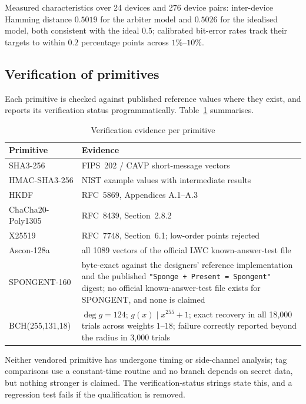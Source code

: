 \documentclass[11pt,a4paper]{article}
\begin{document}
Measured characteristics over 24 devices and 276 device pairs: inter-device Hamming
distance $0.5019$ for the arbiter model and $0.5026$ for the idealised model, both
consistent with the ideal $0.5$; calibrated bit-error rates track their targets to
within $0.2$ percentage points across $1\%$--$10\%$.

\subsection{Verification of primitives}

Each primitive is checked against published reference values where they exist, and
reports its verification status programmatically. Table~\ref{tab:kat} summarises.

\begin{table}[H]
\centering
\caption{Verification evidence per primitive}
\label{tab:kat}
\small
\begin{tabular}{@{}p{3.4cm}p{8.4cm}@{}}
\toprule
\textbf{Primitive} & \textbf{Evidence} \\
\midrule
SHA3-256 & FIPS~202 / CAVP short-message vectors \\
HMAC-SHA3-256 & NIST example values with intermediate results \\
HKDF & RFC~5869, Appendices A.1--A.3 \\
ChaCha20-Poly1305 & RFC~8439, Section~2.8.2 \\
X25519 & RFC~7748, Section~6.1; low-order points rejected \\
Ascon-128a & all 1089 vectors of the official LWC known-answer-test file \\
SPONGENT-160 & byte-exact against the designers' reference implementation and the
published \texttt{"Sponge + Present = Spongent"} digest; no official
known-answer-test file exists for SPONGENT, and none is claimed \\
BCH(255,131,18) & $\deg g = 124$; $g(x) \mid x^{255}+1$; exact recovery in all
18{,}000 trials across weights $1$--$18$; failure correctly reported beyond the
radius in 3{,}000 trials \\
\bottomrule
\end{tabular}
\end{table}

Neither vendored primitive has undergone timing or side-channel analysis; tag
comparisons use a constant-time routine and no branch depends on secret data, but
nothing stronger is claimed. The verification-status strings state this, and a
regression test fails if the qualification is removed.
\end{document}
